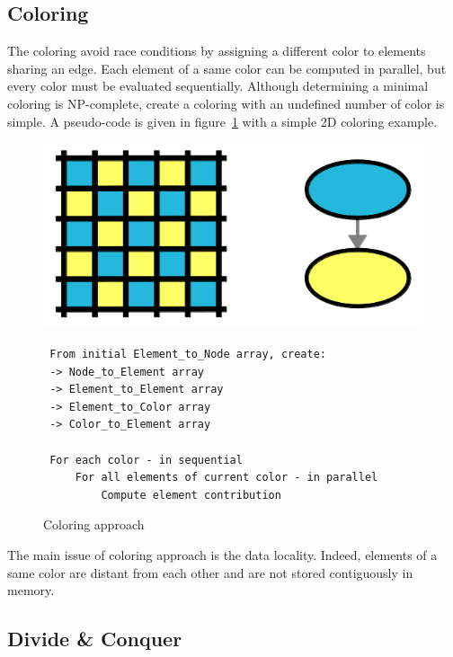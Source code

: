 \documentclass{IOS-Book-Article}
\begin{document}
\subsection{Coloring}
\label{sec:col}
The coloring avoid race conditions by assigning a different color to elements sharing an edge.
Each element of a same color can be computed in parallel, but every color must be evaluated sequentially.
Although determining a minimal coloring is NP-complete, create a coloring with an undefined number of color is simple.
A pseudo-code is given in figure~\ref{fig:colApp} with a simple 2D coloring example.
\begin{figure}[htp]
 \includegraphics[scale=0.25]{Coloring_approach.png}
 \begin{verbatim}
 From initial Element_to_Node array, create:
 -> Node_to_Element array
 -> Element_to_Element array
 -> Element_to_Color array
 -> Color_to_Element array

 For each color - in sequential
     For all elements of current color - in parallel
         Compute element contribution
 \end{verbatim}
 \caption{Coloring approach}
 \label{fig:colApp}
\end{figure}
The main issue of coloring approach is the data locality. Indeed, elements of a same color are distant from each other and are not stored contiguously in memory.

\subsection{Divide \& Conquer}
%
\end{document}
